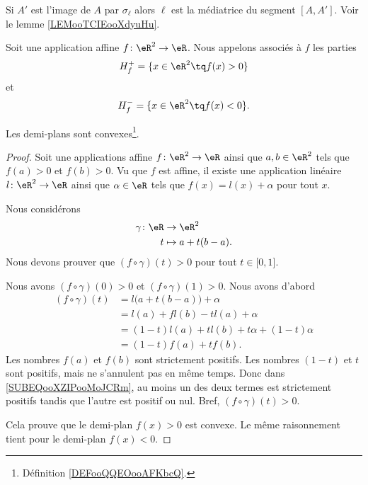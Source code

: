 Si \( A'\) est l'image de \( A\) par \( \sigma_{\ell}\) alors \( \ell\) est la médiatrice du segment \( [A,A']\). Voir le lemme \ref{LEMooTCIEooXdyuHu}.

\begin{definition}
	Soit une application affine \( f\colon \eR^2\to \eR\). Nous appelons  associés à \( f\) les parties
	\begin{equation}
		H_f^+=\{ x\in \eR^2\tq f(x)>0 \}
	\end{equation}
	et
	\begin{equation}
		H_f^-=\{ x\in \eR^2\tq f(x)<0 \}.
	\end{equation}
\end{definition}


\begin{lemma}        \label{LEMooEZEDooSDbrkq}
	Les demi-plans sont convexes\footnote{Définition \ref{DEFooQQEOooAFKbcQ}.}.
\end{lemma}

\begin{proof}
	Soit une applications affine \( f\colon \eR^2\to\eR\) ainsi que \( a,b\in \eR^2\) tels que \( f(a)>0\) et \( f(b)>0\). Vu que \( f\) est affine, il existe une application linéaire \( l\colon \eR^2\to \eR\) ainsi que \( \alpha\in \eR\) tels que \( f(x)=l(x)+\alpha\) pour tout \( x\).

	Nous considérons
	\begin{equation}
		\begin{aligned}
			\gamma\colon \eR & \to \eR^2         \\
			t                & \mapsto a+t(b-a).
		\end{aligned}
	\end{equation}
	Nous devons prouver que \( (f\circ\gamma)(t)>0\) pour tout \( t\in\mathopen[ 0 , 1 \mathclose]\).

	Nous avons \( (f\circ\gamma)(0)>0\) et \( (f\circ\gamma)(1)>0\). Nous avons d'abord
	\begin{subequations}
		\begin{align}
			(f\circ\gamma)(t) & =l\big( a+t(b-a) \big)+\alpha                      \\
			                  & =l(a)+fl(b)-tl(a)+\alpha                           \\
			                  & =(1-t)l(a)+tl(b)+t\alpha+(1-t)\alpha               \\
			                  & =(1-t)f(a)+tf(b).      \label{SUBEQooXZIPooMoJCRm}
		\end{align}
	\end{subequations}
	Les nombres \( f(a)\) et \( f(b)\) sont strictement positifs. Les nombres \( (1-t)\) et \( t\) sont positifs, mais ne s'annulent pas en même temps. Donc dans \eqref{SUBEQooXZIPooMoJCRm}, au moins un des deux termes est strictement positifs tandis que l'autre est positif ou nul. Bref, \( (f\circ\gamma)(t)>0\).

	Cela prouve que le demi-plan \( f(x)>0\) est convexe. Le même raisonnement tient pour le demi-plan \( f(x)<0\).
\end{proof}

